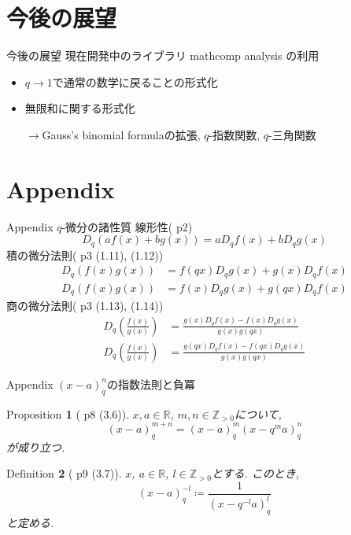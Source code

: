 \documentclass[dvipdfmx,cjk]{beamer}
\theoremstyle{mystyle}
\newtheorem{df}{$\textrm{Definition}$}[section]
\newtheorem{prop}[df]{$\textrm{Proposition}$}
\newcommand{\Z}{\mathbb{Z}}
\newcommand{\R}{\mathbb{R}}
\newcommand{\0}{\textbf{0}}
\begin{document}
\section{今後の展望}

\begin{frame}
	\tableofcontents[currentsection] 
\end{frame}

\begin{frame}{今後の展望}
	現在開発中のライブラリ mathcomp analysis\cite{coq ana} の利用 \pause
	\begin{itemize}
		\item $q \to 1$で通常の数学に戻ることの形式化 \pause
		\item 無限和に関する形式化 \pause
		
		$\to$Gauss's binomial formulaの拡張, 
		$q$-指数関数, $q$-三角関数
	\end{itemize}	
\end{frame}
\section{Appendix}

\begin{frame}
	\tableofcontents[currentsection] 
\end{frame}

\begin{frame}{Appendix $q$-微分の諸性質}
	線形性(\cite{Kac} p2)
	\[
		D_q (af(x) + bg(x)) = a D_q f(x) + b D_q g(x)
	\]
	積の微分法則(\cite{Kac} p3 (1.11), (1.12))
	\begin{align*}
		D_q (f(x) g(x)) &= f(qx) D_q g(x) + g(x) D_q f(x) \\
		D_q (f(x) g(x)) &= f(x) D_q g(x) + g(qx) D_q f(x)
	\end{align*}
	商の微分法則(\cite{Kac} p3 (1.13), (1.14))
	\begin{align*}
		D_q \left( \frac{f(x)}{g(x)} \right) &= \frac{g(x) D_q f(x) - f(x) D_q g(x)}{g(x) g(qx)} \\
		D_q \left( \frac{f(x)}{g(x)} \right) &= \frac{g(qx) D_q f(x) - f(qx) D_q g(x)}{g(x) g(qx)}
	\end{align*}
\end{frame}

\begin{frame}{Appendix $(x -a)^n_q$の指数法則と負冪}
	\begin{prop}[\cite{Kac} p8 (3.6)] \label{q_exp_low}
	  $x,a\in\R$, $m,n\in\Z_{>0}$について, 
	  \[
	    (x-a)^{m+n}_q = (x-a)^m_q (x-q^ma)^n_q
	  \]
	  が成り立つ. 
	\end{prop}
	\begin{df}[\cite{Kac} p9 (3.7)] \label{qbinom_neg}
	  $x$, $a \in \R$, $l\in\Z_{>0}$とする. このとき, 
	  \[
	    (x-a)^{-l}_q \coloneqq \frac{1}{(x-q^{-l}a)^l_q}
	  \]
	  と定める. 
	\end{df}
\end{frame}
\end{document}
